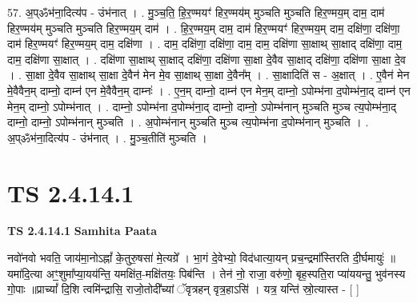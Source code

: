 \documentclass[17pt]{extarticle}
\begin{document}
57. अ॒प्ॐभ॑ना॒दित्य॑प - उंभ॑नात् । . मु॒ञ्च॒ति॒ हि॒र॒ण्मयꣳ॑ हिर॒ण्मय॑म् मुञ्चति मुञ्चति हिर॒ण्मय॒म् दाम॒ दाम॑ हिर॒ण्मय॑म् मुञ्चति मुञ्चति हिर॒ण्मय॒म् दाम॑ । . हि॒र॒ण्मय॒म् दाम॒ दाम॑ हिर॒ण्मयꣳ॑ हिर॒ण्मय॒म् दाम॒ दक्षि॑णा॒ दक्षि॑णा॒ दाम॑ हिर॒ण्मयꣳ॑ हिर॒ण्मय॒म् दाम॒ दक्षि॑णा । . दाम॒ दक्षि॑णा॒ दक्षि॑णा॒ दाम॒ दाम॒ दक्षि॑णा सा॒क्षाथ् सा॒क्षाद् दक्षि॑णा॒ दाम॒ दाम॒ दक्षि॑णा सा॒क्षात् । . दक्षि॑णा सा॒क्षाथ् सा॒क्षाद् दक्षि॑णा॒ दक्षि॑णा सा॒क्षा दे॒वैव सा॒क्षाद् दक्षि॑णा॒ दक्षि॑णा सा॒क्षा दे॒व । . सा॒क्षा दे॒वैव सा॒क्षाथ् सा॒क्षा दे॒वैन॑ मेन मे॒व सा॒क्षाथ् सा॒क्षा दे॒वैन᳚म् । . सा॒क्षादिति॑ स - अ॒क्षात् । . ए॒वैन॑ मेन मे॒वैवैन॒म् दाम्नो॒ दाम्न॑ एन मे॒वैवैन॒म् दाम्नः॑ । . ए॒न॒म् दाम्नो॒ दाम्न॑ एन मेन॒म् दाम्नो॒ ऽपोम्भ॑ना द॒पोम्भ॑ना॒द् दाम्न॑ एन मेन॒म् दाम्नो॒ ऽपोम्भ॑नात् । . दाम्नो॒ ऽपोम्भ॑ना द॒पोम्भ॑ना॒द् दाम्नो॒ दाम्नो॒ ऽपोम्भ॑नान् मुञ्चति मुञ्च त्य॒पोम्भ॑ना॒द् दाम्नो॒ दाम्नो॒ ऽपोम्भ॑नान् मुञ्चति । . अ॒पोम्भ॑नान् मुञ्चति मुञ्च त्य॒पोम्भ॑ना द॒पोम्भ॑नान् मुञ्चति । . अ॒प्ॐभ॑ना॒दित्य॑प - उंभ॑नात् । . मु॒ञ्च॒तीति॑ मुञ्चति । \newline
\pagebreak
{}
\section*{ TS 2.4.14.1 }

\textbf{TS 2.4.14.1 } \newline
\textbf{Samhita Paata} \newline

नवो॑नवो भवति॒ जाय॑मा॒नोऽह्नां᳚ के॒तुरु॒षसा॑ मे॒त्यग्रे᳚ । भा॒गं दे॒वेभ्यो॒ विद॑धात्या॒यन् प्रच॒न्द्रमा᳚स्तिरति दी॒र्घमायुः॑ ॥ यमा॑दि॒त्या अꣳ॒॒शुमा᳚प्या॒यय॑न्ति॒ यमक्षि॑त॒-मक्षि॑तयः॒ पिब॑न्ति । तेन॑ नो॒ राजा॒ वरु॑णो॒ बृह॒स्पति॒रा प्या॑ययन्तु॒ भुव॑नस्य गो॒पाः ॥प्राच्यां᳚ दि॒शि त्वमि॑न्द्रासि॒ राजो॒तोदी᳚च्यां ॅवृत्रहन् वृत्र॒हाऽसि॑ । यत्र॒ यन्ति॑ स्रो॒त्यास्त - [  ] \newline
\end{document}
